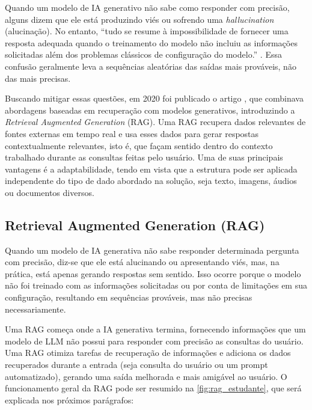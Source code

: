 \documentclass[a4paper, 12pt]{article}
\newcommand{\citeb}[1]{\bibleftbracket\cite{#1}\bibrightbracket}
\begin{document}
    Quando um modelo de IA generativo não sabe como responder com precisão, alguns dizem que ele está produzindo viés ou sofrendo uma \textit{hallucination} (alucinação). No entanto, ``tudo se resume à impossibilidade de fornecer uma resposta adequada quando o treinamento do modelo não incluiu as informações solicitadas além dos problemas clássicos de configuração do modelo.'' \citeb{rothman}. Essa confusão geralmente leva a sequências aleatórias das saídas mais prováveis, não das mais precisas.

    Buscando mitigar essas questões, em 2020 foi publicado o artigo  \citeb{RAG}, que combinava abordagens baseadas em recuperação com modelos generativos, introduzindo a \textit{Retrieval Augmented Generation} (RAG). Uma RAG recupera dados relevantes de fontes externas em tempo real e usa esses dados para gerar respostas contextualmente relevantes, isto é, que façam sentido dentro do contexto trabalhado durante as consultas feitas pelo usuário. Uma de suas principais vantagens é a adaptabilidade, tendo em vista que a estrutura pode ser aplicada independente do tipo de dado abordado na solução, seja texto, imagens, áudios ou documentos diversos.


    \subsection{Retrieval Augmented Generation (RAG)}
    
    Quando um modelo de IA generativa não sabe responder determinada pergunta com precisão, diz-se que ele está alucinando ou apresentando viés, mas, na prática, está apenas gerando respostas sem sentido. Isso ocorre porque o modelo não foi treinado com as informações solicitadas ou por conta de limitações em sua configuração, resultando em sequências prováveis, mas não precisas necessariamente.

    Uma RAG começa onde a IA generativa termina, fornecendo informações que um modelo de LLM não possui para responder com precisão as consultas do usuário. Uma RAG otimiza tarefas de recuperação de informações e adiciona os dados recuperados durante a entrada (seja consulta do usuário ou um prompt automatizado), gerando uma saída melhorada e mais amigável ao usuário. O funcionamento geral da RAG pode ser resumido na \ref{fig:rag_estudante}, que será explicada nos próximos parágrafos:
\end{document}
